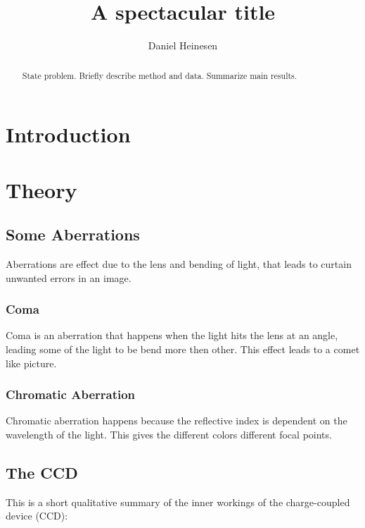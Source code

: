\documentclass{emulateapj}
\begin{document}
\title{A spectacular title}

\author{Daniel Heinesen}





\begin{abstract}
  State problem. Briefly describe method and data. Summarize main results.
\end{abstract}

\section{Introduction}
\label{sec:introduction}

\section{Theory}
\label{sec:theory}

\subsection{Some Aberrations}

Aberrations are effect due to the lens and bending of light, that leads to curtain unwanted errors in an image.

\subsubsection{Coma}
\label{sec:coma}
Coma is an aberration that happens when the light hits the lens at an angle, leading some of the light to be bend more then other. This effect leads to a comet like picture.

\subsubsection{Chromatic Aberration}
\label{sec:chromAb}
Chromatic aberration happens because the reflective index is dependent on the wavelength of the light. This gives the different colors different focal points.


\subsection{The CCD}
\label{sec:ccd}
This is a short qualitative summary of the inner workings of the charge-coupled device (CCD):
\end{document}

